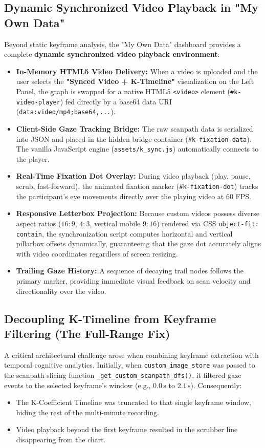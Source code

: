 \documentclass[11pt,a4paper]{article}
\begin{document}
\subsection{Dynamic Synchronized Video Playback in "My Own Data"}
Beyond static keyframe analysis, the "My Own Data" dashboard provides a complete \textbf{dynamic synchronized video playback environment}:
\begin{itemize}
    \item \textbf{In-Memory HTML5 Video Delivery:} When a video is uploaded and the user selects the \textbf{"Synced Video + K-Timeline"} visualization on the Left Panel, the graph is swapped for a native HTML5 \texttt{<video>} element (\texttt{\#k-video-player}) fed directly by a base64 data URI (\texttt{data:video/mp4;base64,...}).
    \item \textbf{Client-Side Gaze Tracking Bridge:} The raw scanpath data is serialized into JSON and placed in the hidden bridge container (\texttt{\#k-fixation-data}). The vanilla JavaScript engine (\texttt{assets/k\_sync.js}) automatically connects to the player.
    \item \textbf{Real-Time Fixation Dot Overlay:} During video playback (play, pause, scrub, fast-forward), the animated fixation marker (\texttt{\#k-fixation-dot}) tracks the participant's eye movements directly over the playing video at 60 FPS.
    \item \textbf{Responsive Letterbox Projection:} Because custom videos possess diverse aspect ratios ($16:9$, $4:3$, vertical mobile $9:16$) rendered via CSS \texttt{object-fit: contain}, the synchronization script computes horizontal and vertical pillarbox offsets dynamically, guaranteeing that the gaze dot accurately aligns with video coordinates regardless of screen resizing.
    \item \textbf{Trailing Gaze History:} A sequence of decaying trail nodes follows the primary marker, providing immediate visual feedback on scan velocity and directionality over the video.
\end{itemize}

\subsection{Decoupling K-Timeline from Keyframe Filtering (The Full-Range Fix)}
A critical architectural challenge arose when combining keyframe extraction with temporal cognitive analytics. Initially, when \texttt{custom\_image\_store} was passed to the scanpath slicing function \texttt{\_get\_custom\_scanpath\_dfs()}, it filtered gaze events to the selected keyframe's window (e.g., $0.0\,\text{s}$ to $2.1\,\text{s}$). Consequently:
\begin{itemize}[noitemsep,topsep=2pt]
    \item The K-Coefficient Timeline was truncated to that single keyframe window, hiding the rest of the multi-minute recording.
    \item Video playback beyond the first keyframe resulted in the scrubber line disappearing from the chart.
\end{itemize}
\end{document}
